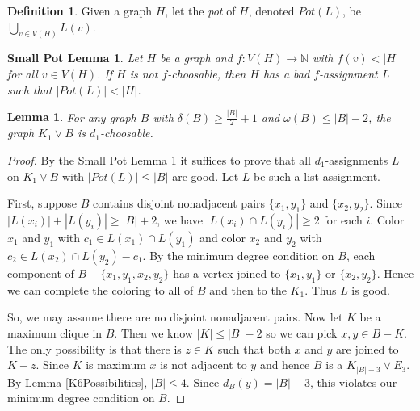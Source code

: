 \documentclass[12pt]{article}
\newtheorem{lemma}[theorem]{Lemma}
\newtheorem{SmallPotLemma}[theorem]{Small Pot Lemma}
\theoremstyle{definition}
\newtheorem{definition}[theorem]{Definition}
\begin{document}
\begin{definition}
Given a graph $H$, let the {\it pot} of $H$, denoted $Pot(L)$, be $\bigcup_{v\in V(H)}L(v)$.
\end{definition}

\begin{SmallPotLemma}\cite{CR12}\label{SmallPotLemma}
Let $H$ be a graph and $f:V(H)\rightarrow\mathbb{N}$ with $f(v)<|H|$ for all $v\in V(H)$. 
If $H$ is not $f$-choosable, then $H$ has a bad $f$-assignment $L$ such that $|Pot(L)|<|H|$.
\end{SmallPotLemma}

\begin{lemma}\label{NeighborhoodLargeMinDegree}
For any graph $B$ with $\delta(B) \geq \frac{|B|}{2} + 1$ and $\omega(B) \leq |B| - 2$, the graph $K_1\vee B$ is $d_1$-choosable.
\end{lemma}
\begin{proof}
By the Small Pot Lemma \ref{SmallPotLemma} it suffices to prove that all $d_1$-assignments $L$ on $K_1\vee B$ with $|Pot(L)| \leq |B|$ are good.  Let $L$ be such a list assignment. 

First, suppose $B$ contains disjoint nonadjacent pairs $\{x_1, y_1\}$ and $\{x_2, y_2\}$.  Since $|L(x_i)| + |L(y_i)| \geq |B| + 2$, we have $|L(x_i) \cap L(y_i)| \geq 2$ for each $i$.  Color $x_1$ and $y_1$ with $c_1 \in L(x_1) \cap L(y_1)$ and color $x_2$ and $y_2$ with $c_2 \in L(x_2) \cap L(y_2) - c_1$.  By the minimum degree condition on $B$, each component of $B - \{x_1, y_1, x_2, y_2\}$ has a vertex joined to $\{x_1, y_1\}$ or $\{x_2, y_2\}$.  Hence we can complete the coloring to all of $B$ and then to the $K_1$.  Thus $L$ is good.

So, we may assume there are no disjoint nonadjacent pairs. Now let $K$ be a maximum clique in $B$. Then we know $|K| \leq |B| - 2$ so we can pick $x,y \in B-K$.  The only possibility is that there is $z \in K$ such that both $x$ and $y$ are joined to $K-z$.  Since $K$ is maximum $x$ is not adjacent to $y$ and hence $B$ is a $K_{|B| - 3}\vee E_3$.  By Lemma \ref{K6Possibilities}, $|B| \leq 4$.  Since $d_B(y) = |B| - 3$, this violates our minimum degree condition on $B$.
\end{proof}
\end{document}
